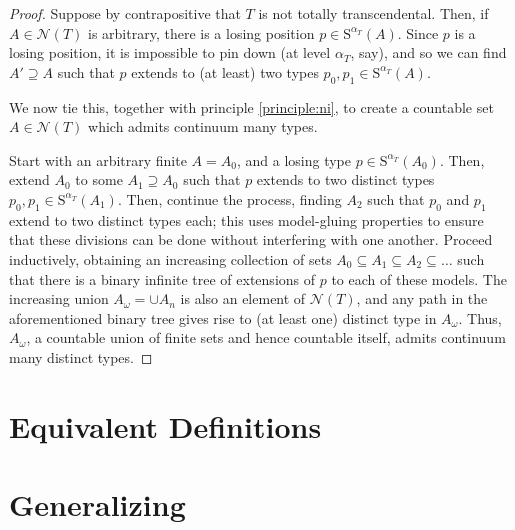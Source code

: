 \documentclass{article}
\theoremstyle{nonumberplain}
\newtheorem{proof}{Proof}
\newcommand{\calN}{\mathcal{N}}
\newcommand{\Stone}{\mathrm{S}}
\begin{document}
\begin{proof}
Suppose by contrapositive that $T$ is not totally transcendental. Then, if $A \in \calN(T)$ is arbitrary, there is a losing position $p \in \Stone^{\alpha_T}(A)$. Since $p$ is a losing position, it is impossible to pin down (at level $\alpha_T$, say), and so we can find $A' \supseteq A$ such that $p$ extends to (at least) two types $p_0, p_1 \in \Stone^{\alpha_T}(A)$.

We now tie this, together with principle \ref{principle:ni}, to create a countable set $A \in \calN(T)$ which admits continuum many types.

Start with an arbitrary finite $A = A_0$, and a losing type $p \in \Stone^{\alpha_T}(A_0)$. Then, extend $A_0$ to some $A_1 \supseteq A_0$ such that $p$ extends to two distinct types $p_0, p_1 \in \Stone^{\alpha_T}(A_1)$. Then, continue the process, finding $A_2$ such that $p_0$ and $p_1$ extend to two distinct types each; this uses model-gluing properties to ensure that these divisions can be done without interfering with one another. Proceed inductively, obtaining an increasing collection of sets $A_0 \subseteq A_1 \subseteq A_2 \subseteq \dots$ such that there is a binary infinite tree of extensions of $p$ to each of these models. The increasing union $A_\omega = \cup A_n$ is also an element of $\calN(T)$, and any path in the aforementioned binary tree gives rise to (at least one) distinct type in $A_\omega$. Thus, $A_\omega$, a countable union of finite sets and hence countable itself, admits continuum many distinct types.
\end{proof}

\section{Equivalent Definitions}

\section{Generalizing}\label{sec:gen}



\end{document}
